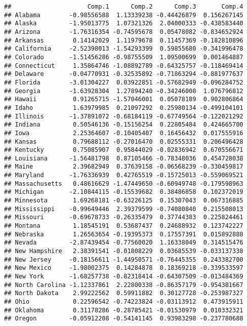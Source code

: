 \documentclass[]{article}
\begin{document}
\begin{verbatim}
##                     Comp.1      Comp.2      Comp.3       Comp.4
## Alabama        -0.98556588  1.13339238 -0.44426879  0.156267145
## Alaska         -1.95013775  1.07321326  2.04000333 -0.438583440
## Arizona        -1.76316354 -0.74595678  0.05478082 -0.834652924
## Arkansas        0.14142029  1.11979678  0.11457369 -0.182810896
## California     -2.52398013 -1.54293399  0.59855680 -0.341996478
## Colorado       -1.51456286 -0.98755509  1.09500699  0.001464887
## Connecticut     1.35864746 -1.08892789 -0.64325757 -0.118469414
## Delaware       -0.04770931 -0.32535892 -0.71863294 -0.881977637
## Florida        -3.01304227  0.03922851 -0.57682949 -0.096284752
## Georgia        -1.63928304  1.27894240 -0.34246008  1.076796812
## Hawaii          0.91265715 -1.57046001  0.05078189  0.902806864
## Idaho           1.63979985  0.21097292  0.25980134 -0.499104101
## Illinois       -1.37891072 -0.68184119 -0.67749564 -0.122021292
## Indiana         0.50546136 -0.15156254  0.22805484  0.424665700
## Iowa            2.25364607 -0.10405407  0.16456432  0.017555916
## Kansas          0.79688112 -0.27016470  0.02555331  0.206496428
## Kentucky        0.75085907  0.95844029 -0.02836942  0.670556671
## Louisiana      -1.56481798  0.87105466 -0.78348036  0.454728038
## Maine           2.39682949  0.37639158 -0.06568239 -0.330459817
## Maryland       -1.76336939  0.42765519 -0.15725013 -0.559069521
## Massachusetts   0.48616629 -1.47449650 -0.60949748 -0.179598963
## Michigan       -2.10844115 -0.15539682  0.38486858  0.102372019
## Minnesota       1.69268181 -0.63226125  0.15307043  0.067316885
## Mississippi    -0.99649446  2.39379599 -0.74080840  0.215508013
## Missouri       -0.69678733 -0.26335479  0.37744383  0.225824461
## Montana         1.18545191  0.53687437  0.24688932  0.123742227
## Nebraska        1.26563654 -0.19395373  0.17557391  0.015892888
## Nevada         -2.87439454 -0.77560020  1.16338049  0.314515476
## New Hampshire   2.38391541 -0.01808229  0.03685539 -0.033137338
## New Jersey     -0.18156611 -1.44950571 -0.76445355  0.243382700
## New Mexico     -1.98002375  0.14284878  0.18369218 -0.339533597
## New York       -1.68257738 -0.82318414 -0.64307509 -0.013484369
## North Carolina -1.12337861  2.22800338 -0.86357179 -0.954381667
## North Dakota    2.99222562  0.59911882  0.30127728 -0.253987327
## Ohio            0.22596542 -0.74223824 -0.03113912  0.473915911
## Oklahoma        0.31178286 -0.28785421 -0.01530979  0.010332321
## Oregon         -0.05912208 -0.54141145  0.93983298 -0.237780688

\end{verbatim}
\end{document}
